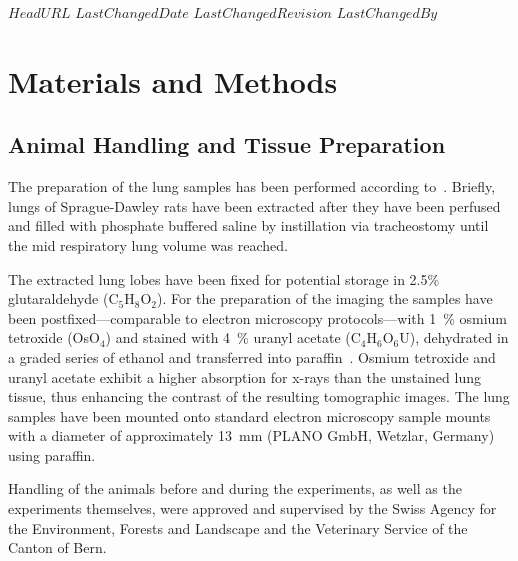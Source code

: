 \svnidlong
{$HeadURL$}
{$LastChangedDate$}
{$LastChangedRevision$}
{$LastChangedBy$}

\begin{center}
\end{center}

\section{Materials and Methods}
\label{sec:materials and methods}
\subsection{Animal Handling and Tissue Preparation}
The preparation of the lung samples has been performed according to~\citet{Schittny1997,Schittny1998}. Briefly, lungs of Sprague-Dawley rats have been extracted after they have been perfused and filled with phosphate buffered saline by instillation via tracheostomy until the mid respiratory lung volume was reached.

The extracted lung lobes have been fixed for potential storage in 2.5\% glutaraldehyde (C$_5$H$_8$O$_2$). For the preparation of the imaging the samples have been postfixed---comparable to electron microscopy protocols---with \SI{1}{\percent} osmium tetroxide (OsO$_4$) and stained with \SI{4}{\percent} uranyl acetate (C$_4$H$_6$O$_6$U), dehydrated in a graded series of ethanol and transferred into paraffin~\cite{Schittny1998,Schittny1997}. Osmium tetroxide and uranyl acetate exhibit a higher absorption for x-rays than the unstained lung tissue, thus enhancing the contrast of the resulting tomographic images. The lung samples have been mounted onto standard electron microscopy sample mounts with a diameter of approximately \SI{13}{\milli\meter} (PLANO GmbH, Wetzlar, Germany) using paraffin.

Handling of the animals before and during the experiments, as well as the experiments themselves, were approved and supervised by the Swiss Agency for the Environment, Forests and Landscape and the Veterinary Service of the Canton of Bern.

